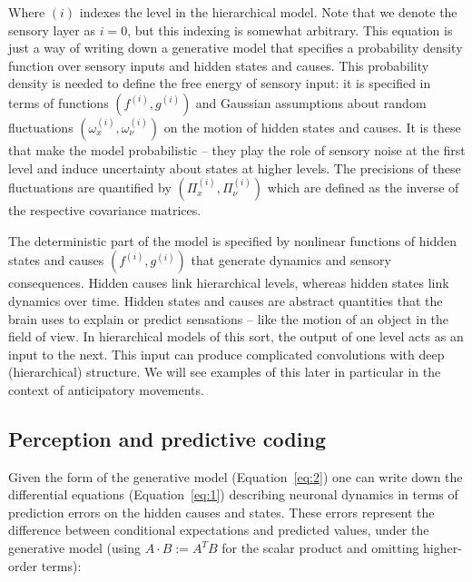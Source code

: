 \documentclass[a4paper]{article} %
\begin{document}
Where $(i)$ indexes the level in the hierarchical model. Note that we denote the sensory layer as $i=0$, but this indexing is somewhat arbitrary. %
This equation is just a way of writing down a generative model that
specifies a probability density function over sensory inputs and hidden
states and causes. This probability density is needed to define the free
energy of sensory input: it is specified in terms of functions $(f^{(i)} , g^{(i)})$ and Gaussian assumptions about random fluctuations $(\omega^{(i)}_x, \omega^{(i)}_\nu)$ on
the motion of hidden states and causes. It is these that make the model
probabilistic -- they play the role of sensory noise at the first level
and induce uncertainty about states at higher levels. The precisions of
these fluctuations are quantified by $(\Pi^{(i)}_x, \Pi^{(i)}_\nu)$ 
which are defined as the inverse of the respective covariance matrices.

The deterministic part of the model is specified by nonlinear functions of hidden states and causes $(f^{(i)} , g^{(i)})$ that generate dynamics and sensory
consequences. Hidden causes link hierarchical levels, whereas hidden
states link dynamics over time. Hidden states and causes are abstract
quantities that the brain uses to explain or predict sensations -- like
the motion of an object in the field of view. In hierarchical models of
this sort, the output of one level acts as an input to the next. This
input can produce complicated convolutions with deep (hierarchical)
structure. We will see examples of this later in particular in the
context of anticipatory movements.

\subsection{Perception and predictive coding}

Given the form of the generative model (Equation~\ref{eq:2}) one can write down
the differential equations (Equation~\ref{eq:1}) describing neuronal dynamics in
terms of prediction errors on the hidden causes and states. These errors
represent the difference between conditional expectations and predicted
values, under the generative model (using $A \cdot B := A^T B$ for the scalar product and omitting higher-order terms):
\end{document}
